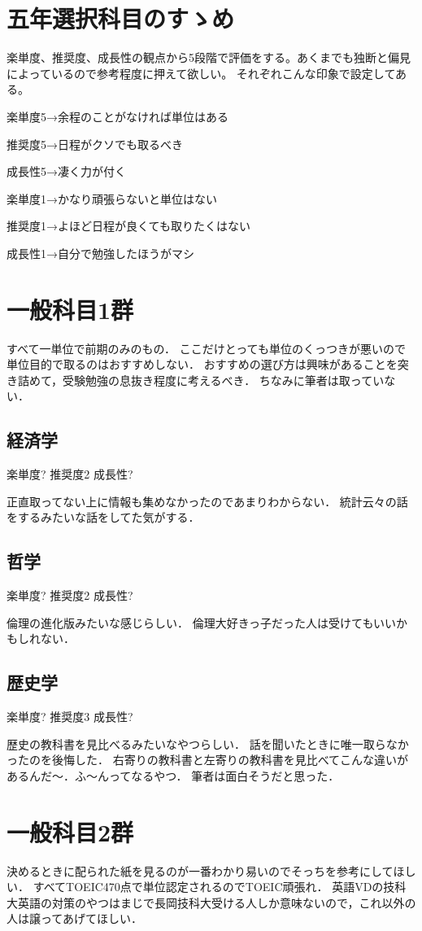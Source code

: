 \documentclass[titlepage]{jarticle}
\begin{document}
\section*{五年選択科目のすゝめ}
楽単度、推奨度、成長性の観点から5段階で評価をする。あくまでも独断と偏見によっているので参考程度に押えて欲しい。
それぞれこんな印象で設定してある。

楽単度5→余程のことがなければ単位はある

推奨度5→日程がクソでも取るべき

成長性5→凄く力が付く



楽単度1→かなり頑張らないと単位はない

推奨度1→よほど日程が良くても取りたくはない

成長性1→自分で勉強したほうがマシ

\section*{一般科目1群}
すべて一単位で前期のみのもの．
ここだけとっても単位のくっつきが悪いので単位目的で取るのはおすすめしない．
おすすめの選び方は興味があることを突き詰めて，受験勉強の息抜き程度に考えるべき．
ちなみに筆者は取っていない．

\subsection*{経済学}
楽単度?
推奨度2
成長性?

正直取ってない上に情報も集めなかったのであまりわからない．
統計云々の話をするみたいな話をしてた気がする．
\subsection*{哲学}
楽単度?
推奨度2
成長性?

倫理の進化版みたいな感じらしい．
倫理大好きっ子だった人は受けてもいいかもしれない．

\subsection*{歴史学}
楽単度?
推奨度3
成長性?

歴史の教科書を見比べるみたいなやつらしい．
話を聞いたときに唯一取らなかったのを後悔した．
右寄りの教科書と左寄りの教科書を見比べてこんな違いがあるんだ～．ふ～んってなるやつ．
筆者は面白そうだと思った．

\section*{一般科目2群}
決めるときに配られた紙を見るのが一番わかり易いのでそっちを参考にしてほしい．
すべてTOEIC470点で単位認定されるのでTOEIC頑張れ．
英語VDの技科大英語の対策のやつはまじで長岡技科大受ける人しか意味ないので，これ以外の人は譲ってあげてほしい．
\end{document}
